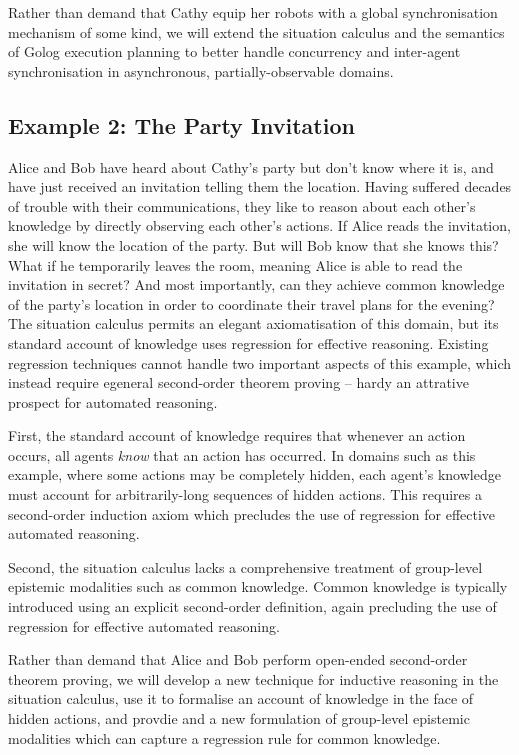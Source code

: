 Rather than demand that Cathy equip her robots with a global synchronisation
mechanism of some kind, we will extend the situation calculus and
the semantics of Golog execution planning to better handle concurrency
and inter-agent synchronisation in asynchronous, partially-observable
domains.


\subsection*{Example 2: The Party Invitation}

Alice and Bob have heard about Cathy's party but don't know where
it is, and have just received an invitation telling them the location.
Having suffered decades of trouble with their communications, they
like to reason about each other's knowledge by directly observing
each other's actions. If Alice reads the invitation, she will know
the location of the party. But will Bob know that she knows this?
What if he temporarily leaves the room, meaning Alice is able to read
the invitation in secret? And most importantly, can they achieve common
knowledge of the party's location in order to coordinate their travel
plans for the evening?\\


The situation calculus permits an elegant axiomatisation of this domain,
but its standard account of knowledge uses regression for effective
reasoning. Existing regression techniques cannot handle two important
aspects of this example, which instead require egeneral second-order
theorem proving -- hardy an attrative prospect for automated reasoning.

First, the standard account of knowledge requires that whenever an
action occurs, all agents \emph{know} that an action has occurred.
In domains such as this example, where some actions may be completely
hidden, each agent's knowledge must account for arbitrarily-long sequences
of hidden actions. This requires a second-order induction axiom which
precludes the use of regression for effective automated reasoning.

Second, the situation calculus lacks a comprehensive treatment of
group-level epistemic modalities such as common knowledge. Common
knowledge is typically introduced using an explicit second-order definition,
again precluding the use of regression for effective automated reasoning.

Rather than demand that Alice and Bob perform open-ended second-order
theorem proving, we will develop a new technique for inductive reasoning
in the situation calculus, use it to formalise an account of knowledge
in the face of hidden actions, and provdie and a new formulation of
group-level epistemic modalities which can capture a regression rule
for common knowledge.


